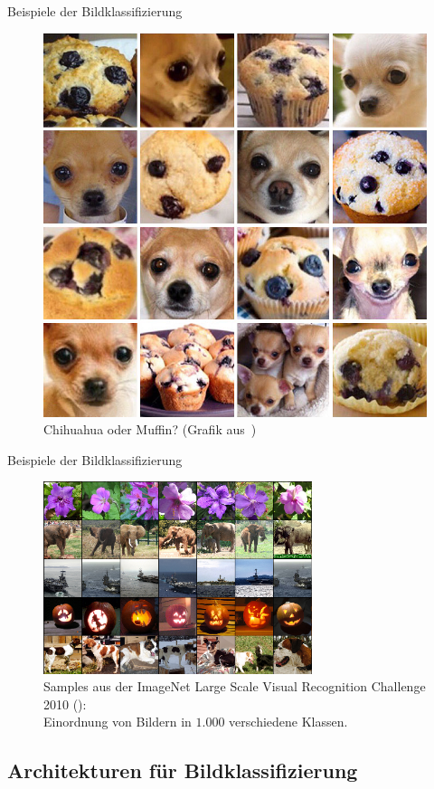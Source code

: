 \documentclass[envcountsect, smaller, aspectratio=149]{beamer}
\begin{document}
\begin{frame}{Beispiele der Bildklassifizierung}
    \begin{figure}
        \includegraphics[width=.5\textwidth]{chihuahua.jpg}
        \caption{Chihuahua oder Muffin? {\scriptsize (Grafik aus~\cite{chihuahua})}}
    \end{figure}
\end{frame}

\begin{frame}{Beispiele der Bildklassifizierung}
    \begin{figure}
        \includegraphics[width=0.7\textwidth]{imagenet-samples.png}
        \caption{Samples aus der ImageNet Large Scale Visual Recognition Challenge 2010 (\cite{ILSVRC15}):\\ Einordnung von Bildern in $1.000$ verschiedene Klassen.
        }
    \end{figure}
\end{frame}


\subsection{Architekturen für Bildklassifizierung}
\end{document}
